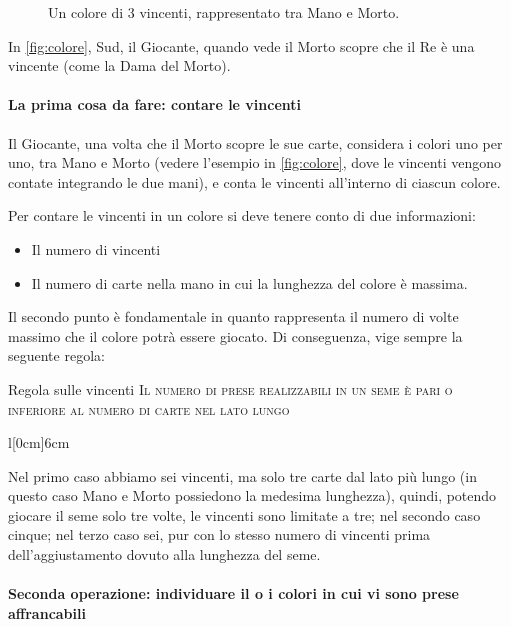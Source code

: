 \documentclass[../corsofiori.tex]{subfiles}
\begin{document}
\begin{figure}[ht]
    \caption{Un colore di 3 vincenti, rappresentato tra Mano e Morto.}\label{fig:colore}
\end{figure}

In \autoref{fig:colore}, Sud, il Giocante, quando vede il Morto scopre che il Re è una vincente (come la Dama del Morto).

\paragraph{La prima cosa da fare: contare le vincenti}
Il Giocante, una volta che il Morto scopre le sue carte, considera i colori uno per uno, tra Mano e Morto (vedere
l'esempio in \autoref{fig:colore}, dove le vincenti vengono contate integrando le due mani), e conta le
vincenti all'interno di ciascun colore.

Per contare le vincenti in un colore si deve tenere conto di due informazioni:
\begin{itemize}
    \item Il numero di vincenti
    \item Il numero di carte nella mano in cui la lunghezza del colore è massima.
\end{itemize}

Il secondo punto è fondamentale in quanto rappresenta il numero di volte massimo che il colore potrà essere giocato.
Di conseguenza, vige sempre la seguente regola:

\medskip
\begin{regola}{Regola sulle vincenti}
    \textsc{Il numero di prese realizzabili in un seme è pari o inferiore al numero di carte nel lato lungo}

\end{regola}
\bigskip


\begin{wraptable}[5]{l}[0cm]{6cm}
    \hfill{}\hfill{}\hfill
\end{wraptable}

Nel primo caso abbiamo sei vincenti, ma solo tre carte dal lato più lungo (in questo caso Mano e Morto possiedono la
medesima lunghezza), quindi, potendo giocare il seme solo tre volte, le
vincenti sono limitate a tre; nel secondo caso cinque; nel terzo
caso sei, pur con lo stesso numero di vincenti prima dell'aggiustamento dovuto alla lunghezza del seme.

\paragraph{Seconda operazione: individuare il o i colori in cui vi sono prese affrancabili}
\end{document}
